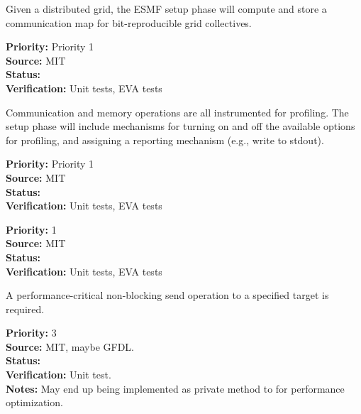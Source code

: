 
Given a distributed grid, the ESMF setup
phase will compute and store a communication map for
bit-reproducible grid collectives.

\begin{reqlist}
{\bf Priority:} Priority 1 \\
{\bf Source:}  MIT \\
{\bf Status:}  \\
{\bf Verification:} Unit tests, EVA tests \\
\end{reqlist}


Communication and memory operations are all instrumented for profiling. 
The setup phase will include mechanisms for
turning on and off the available options for profiling, and assigning
a reporting mechanism (e.g., write to stdout).

\begin{reqlist}
{\bf Priority:} Priority 1 \\
{\bf Source:}  MIT \\
{\bf Status:}  \\
{\bf Verification:} Unit tests, EVA tests \\
\end{reqlist}

\begin{reqlist}
{\bf Priority:} 1 \\
{\bf Source:}  MIT \\
{\bf Status:}  \\
{\bf Verification:} Unit tests, EVA tests \\
\end{reqlist}



A performance-critical non-blocking send operation to a specified
target is required.
\begin{reqlist}
{\bf Priority:} 3 \\
{\bf Source:}  MIT, maybe GFDL. \\
{\bf Status:}  \\
{\bf Verification:} Unit test. \\
{\bf Notes:}  May end up being implemented as private method to for performance
optimization.
\end{reqlist}

